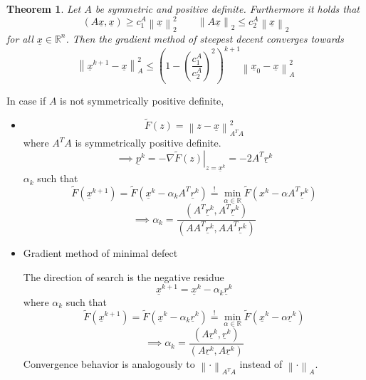 \documentclass{article}
\newtheorem{theorem}{Theorem}
\newcommand{\norm}[1]{\left\|#1\right\|}
\begin{document}
\begin{theorem}
  Let $A$ be symmetric and positive definite. Furthermore it holds that
  \[ (A \underline{x}, \underline{x}) \geq c_1^A \norm{\underline{x}}_2^2 \qquad \norm{A \underline{x}}_2 \leq c_2^A \norm{\underline x}_2  \]
  for all $\underline{x} \in \mathbb R^n$. Then the gradient method of steepest decent converges towards
  \[ \norm{\underline{x}^{k+1} - \underline{x}}_A^2 \leq \left(1 - \left(\frac{c_1^A}{c_2^A}\right)^2\right)^{k+1} \norm{\underline x_0 - \underline x}_A^2 \]
\end{theorem}

In case if $A$ is not symmetrically positive definite,
\begin{itemize}
  \item 
    \[ \tilde F(z) = \norm{z - \underline{x}}_{A^T A}^{2} \]
    where $A^T A$ is symmetrically positive definite.
    \[ \implies \underline p^k = \left. -\nabla \tilde F(z) \right|_{z = \underline{x}^k} = -2 A^T \underline{r}^k \]
    $\alpha_k$ such that
    \[ \tilde F(\underline{x}^{k+1}) = \tilde F(\underline{x}^k - \alpha_k A^T \underline{r}^k) \stackrel!= \min_{\alpha \in \mathbb R} \tilde F(x^k - \alpha A^T \underline{r}^k) \]
    \[ \implies \alpha_k = \frac{(A^T \underline r^k, A^T \underline r^k)}{(AA^T \underline r^k, AA^T \underline r^k)} \]
  \item
    Gradient method of minimal defect

    The direction of search is the negative residue
    \[ \underline x^{k+1} = \underline x^k - \alpha_k \underline r^k \]
    where $\alpha_k$ such that
    \[ \tilde F(\underline x^{k+1}) = \tilde F(\underline x^k - \alpha_k \underline r^k) \stackrel!= \min_{\alpha \in \mathbb R} \tilde F(\underline{x}^k - \alpha \underline{r}^k) \]
    \[ \implies \alpha_k = \frac{(A \underline r^k, \underline r^k)}{(A \underline r^k, A \underline r^k)} \]
    Convergence behavior is analogously to $\norm{\cdot}_{A^TA}$ instead of $\norm{\cdot}_A$.
\end{itemize}
\end{document}
